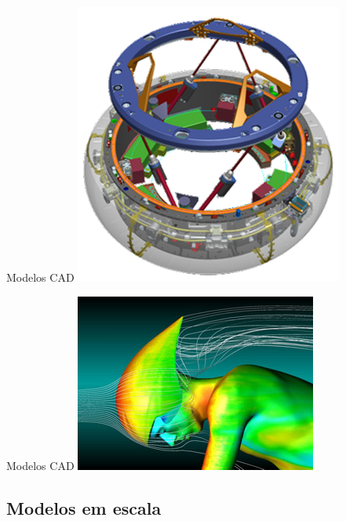 \documentclass{beamer}
\begin{document}
\begin{frame}{Modelos CAD}
  \centering
  \includegraphics[height=\textheight]{modelos/NDS_CAD_drawing}
\end{frame}

\begin{frame}{Modelos CAD}
  \centering
  \includegraphics[width=\textwidth]{modelos/cycliste-cfd}
\end{frame}

\subsection{Modelos em escala}
\end{document}
